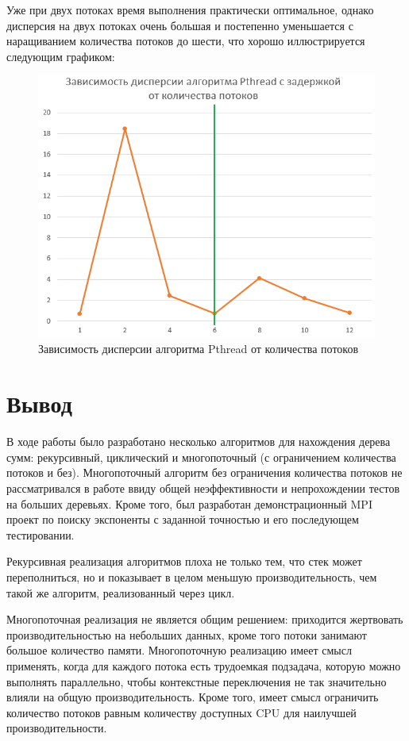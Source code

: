 \documentclass[14pt,a4paper,report]{report}
\begin{document}
Уже при двух потоках время выполнения практически оптимальное, однако дисперсия на двух потоках очень большая и постепенно уменьшается с наращиванием количества потоков до шести, что хорошо иллюстрируется следующим графиком:

\begin{figure}[h!]
	\centering
	\includegraphics[scale = 0.55]{images/5.png}
	\caption{Зависимость дисперсии алгоритма Pthread от количества потоков}
	\label{image:5}
\end{figure}

\section{Вывод}

В ходе работы было разработано несколько алгоритмов для нахождения дерева сумм: рекурсивный, циклический и многопоточный (с ограничением количества потоков и без). Многопоточный алгоритм без ограничения количества потоков не рассматривался в работе ввиду общей неэффективности и непрохождении тестов на больших деревьях. Кроме того, был разработан демонстрационный MPI проект по поиску экспоненты с заданной точностью и его последующем тестировании.

Рекурсивная реализация алгоритмов плоха не только тем, что стек может переполниться, но и показывает в целом меньшую производительность, чем такой же алгоритм, реализованный через цикл.

Многопоточная реализация не является общим решением: приходится жертвовать производительностью на небольших данных, кроме того потоки занимают большое количество памяти. Многопоточную реализацию имеет смысл применять, когда для каждого потока есть трудоемкая подзадача, которую можно выполнять параллельно, чтобы контекстные переключения не так значительно влияли на общую производительность. Кроме того, имеет смысл ограничить количество потоков равным количеству доступных CPU для наилучшей производительности.
\end{document}
